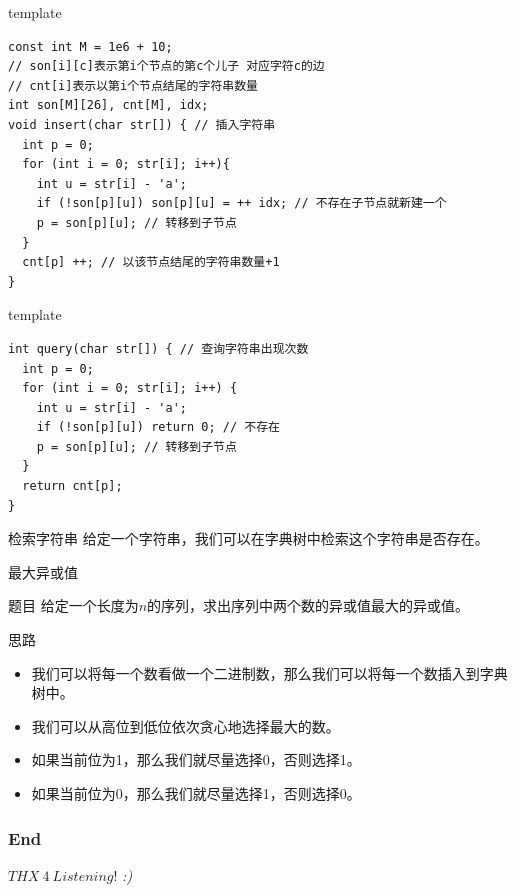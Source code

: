 \documentclass{ldr-simple-gray}
\begin{document}
  \begin{frame}[fragile]{template}
    \begin{verbatim}
const int M = 1e6 + 10;
// son[i][c]表示第i个节点的第c个儿子 对应字符c的边
// cnt[i]表示以第i个节点结尾的字符串数量
int son[M][26], cnt[M], idx;
void insert(char str[]) { // 插入字符串
  int p = 0;
  for (int i = 0; str[i]; i++){
    int u = str[i] - 'a';
    if (!son[p][u]) son[p][u] = ++ idx; // 不存在子节点就新建一个
    p = son[p][u]; // 转移到子节点
  }
  cnt[p] ++; // 以该节点结尾的字符串数量+1
}\end{verbatim}
  \end{frame}

  \begin{frame}[fragile]{template}
    \begin{verbatim}
int query(char str[]) { // 查询字符串出现次数
  int p = 0;
  for (int i = 0; str[i]; i++) {
    int u = str[i] - 'a';
    if (!son[p][u]) return 0; // 不存在
    p = son[p][u]; // 转移到子节点
  }
  return cnt[p];
}\end{verbatim}
  \end{frame}

  \begin{frame}{检索字符串}
    给定一个字符串，我们可以在字典树中检索这个字符串是否存在。
  \end{frame}

  \begin{frame}{最大异或值}
    \begin{block}{题目}
      给定一个长度为$n$的序列，求出序列中两个数的异或值最大的异或值。
    \end{block}
    \begin{block}{思路}
      \begin{itemize}
        \item 我们可以将每一个数看做一个二进制数，那么我们可以将每一个数插入到字典树中。
        \item 我们可以从高位到低位依次贪心地选择最大的数。
        \item 如果当前位为1，那么我们就尽量选择0，否则选择1。
        \item 如果当前位为0，那么我们就尽量选择1，否则选择0。
      \end{itemize}
    \end{block}
  \end{frame}

  \begin{frame} %
    \frametitle{End}
    \begin{center}
      \Huge{$THX\ 4\ Listening!$}
      \emph{:)}
    \end{center}
  \end{frame}
\end{document}
